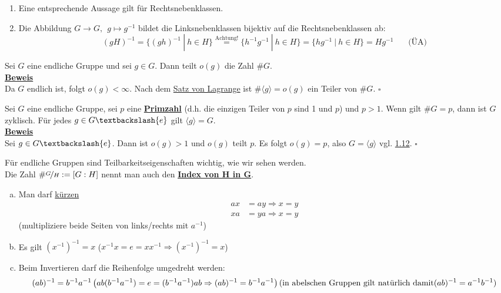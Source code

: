 \documentclass[a4paper, pagesize=pdftex, pdftex, twoside, headsepline, index=totoc,toc=listof, fontsize=10pt, cleardoublepage=empty, headinclude, DIV=13, BCOR=13mm]{scrartcl}
\newcommand{\bet}[1]{\uline{\textbf{#1}}} %
\newcommand{\Index}[1]{\uline{\textbf{#1}}\index{#1}} %
\newcommand{\enbrace}[1]{\ensuremath{\left( #1\right)}}
\newcommand{\lh}[1]{\langle #1 \rangle} %
\begin{document}
\begin{enumerate}[(1)]
	\item Eine entsprechende Aussage gilt für Rechtsnebenklassen.
	\item Die Abbildung $G \to G,~~g\mapsto g^{-1}$ bildet die Linksnebenklassen bijektiv auf die Rechtsnebenklassen ab:
	\[
	(gH)^{-1}=\{(gh)^{-1}~|~h \in H \} \stackrel{\text{Achtung!}}{=}\{h^{-1}g^{-1}~|~h \in H \}=\{hg^{-1}~|~h\in H \}=Hg^{-1}~~~~~~~~\text{(ÜA)}
	\]
\end{enumerate}

Sei $G$ eine endliche Gruppe und sei $g\in G$. Dann teilt $o(g)$ die Zahl $\#G$.\\
\bet{Beweis}\\
Da $G$ endlich ist, folgt $o(g)<\infty$. Nach dem \hyperref[sub:satz_von_lagrange]{Satz von Lagrange} ist $\#\lh{g}=o(g)$ ein Teiler von $\#G$.
\hfill $\square$

Sei $G$ eine endliche Gruppe, sei $p$ eine \Index{Primzahl}  (d.h. die einzigen Teiler von $p$ sind 1 und $p$) und $p>1$. Wenn gilt $\#G=p$, dann ist $G$ zyklisch. Für jedes $g\in G \textbackslash\{e\}$ gilt $\lh{g}=G$.\\
\bet{Beweis}\\
Sei $g \in G\textbackslash\{e\}$. Dann ist $o(g)>1$ und $o(g)$ teilt $p$. Es folgt $o(g)=p$, also $G=\lh{g}$ vgl. \hyperref[sub:zyklische_gruppen]{1.12}.
\hfill $\square$

Für endliche Gruppen sind Teilbarkeitseigenschaften wichtig, wie wir sehen werden.\\
Die Zahl $\#\nicefrac{G}{H}:=[G:H]$ nennt man auch den \Index{Index von H in G}.

\begin{enumerate}[(a)]
	\item Man darf \uline{kürzen}
	\begin{equation*}
	\begin{aligned}
		ax &= ay \Rightarrow x=y\\
		xa &= ya \Rightarrow x=y
	\end{aligned}
	\end{equation*}
	(multipliziere beide Seiten von links/rechts mit $a^{-1}$)
	\item Es gilt $(x^{-1})^{-1}=x$   ($x^{-1}x=e=xx^{-1} \Rightarrow (x^{-1})^{-1}=x$)
	\item Beim Invertieren darf die Reihenfolge umgedreht werden:\\
	\[(ab)^{-1}=b^{-1}a^{-1}\\
	\enbrace{ab(b^{-1}a^{-1})=e=(b^{-1}a^{-1})ab \Rightarrow (ab)^{-1}=b^{-1}a^{-1}}\\
	(\text{in abelschen Gruppen gilt natürlich damit} (ab)^{-1}=a^{-1}b^{-1} )
	\]
\end{enumerate}
\end{document}
